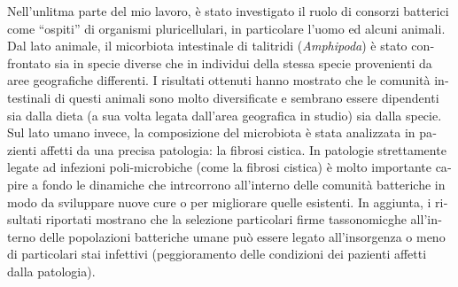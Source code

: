 \begin{otherlanguage}{italian}
Nell'unlitma parte del mio lavoro, è stato investigato il ruolo di consorzi batterici come ``ospiti'' di organismi pluricellulari, in particolare l'uomo ed alcuni animali. Dal lato animale, il micorbiota intestinale di talitridi (\textit{Amphipoda}) è stato confrontato sia in specie diverse che in individui della stessa specie provenienti da aree geografiche differenti. I risultati ottenuti hanno mostrato che le comunità intestinali di questi animali sono molto diversificate e sembrano essere dipendenti sia dalla dieta (a sua volta legata dall'area geografica in studio) sia dalla specie. Sul lato umano invece, la composizione del microbiota è stata analizzata in pazienti affetti da una precisa patologia: la fibrosi cistica. In patologie strettamente legate ad infezioni poli-microbiche (come la fibrosi cistica) è molto importante capire a fondo le dinamiche che intrcorrono all'interno delle comunità batteriche in modo da sviluppare nuove cure o per migliorare quelle esistenti. In aggiunta, i risultati riportati mostrano che la selezione particolari firme tassonomicghe all'interno delle popolazioni batteriche umane può essere legato all'insorgenza o meno di particolari stai infettivi (peggioramento delle condizioni dei pazienti affetti dalla patologia).

\end{otherlanguage}